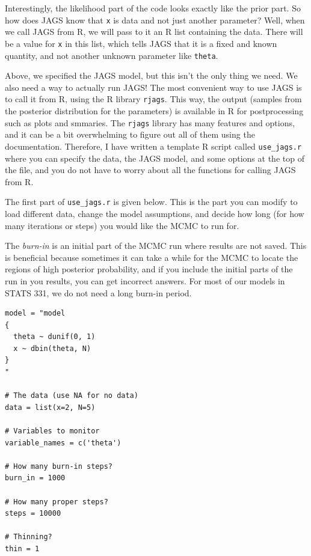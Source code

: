 Interestingly, the likelihood part of the code looks exactly like the
prior part. So how does JAGS know that {\tt x} is data and not just another
parameter? Well, when we call JAGS from R, we will pass to it an R list containing
the data. There will be a value for {\tt x} in this list, which tells JAGS that
it is a fixed and known quantity, and not another unknown parameter like {\tt theta}.

Above, we specified the JAGS model, but this isn't the only thing we need.
We also need a way to actually run JAGS! The most
convenient way to use JAGS is to call it from R, using the R library
{\tt rjags}. This way, the output (samples from the posterior distribution for
the parameters) is available in R for postprocessing such as plots and
smmaries. The
{\tt rjags} library has many features and options, and it can be a bit
overwhelming to figure out all of them using the documentation.
Therefore, I have written a template
R script called {\tt use\_jags.r} where you can specify the data, the JAGS
model, and some options at the
top of the file, and you do not have to worry about all the functions for
calling JAGS from R.

The first part of {\tt use\_jags.r} is given below. This is the part you
can modify to load different data, change the model assumptions, and decide
how long (for how many iterations or steps) you would like the MCMC to run for.

The {\it burn-in} is an initial part of the
MCMC run where results are not saved. This is beneficial because sometimes
it can take a while for the MCMC to locate the regions of high posterior
probability, and if you include the initial parts of the run in you results,
you can get incorrect answers. For most of our models in STATS 331, we do not
need a long burn-in period.

\begin{framed}
\begin{verbatim}
model = "model
{
  theta ~ dunif(0, 1)
  x ~ dbin(theta, N)
}
"

# The data (use NA for no data)
data = list(x=2, N=5)

# Variables to monitor
variable_names = c('theta')

# How many burn-in steps?
burn_in = 1000

# How many proper steps?
steps = 10000

# Thinning?
thin = 1
\end{verbatim}
\end{framed}

